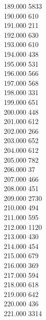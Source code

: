 { 189.000	5833 \\
 190.000	610 \\
 191.000	211 \\
 192.000	630 \\
 193.000	610 \\
 194.000	438 \\
 195.000	531 \\
 196.000	566 \\
 197.000	568 \\
 198.000	331 \\
 199.000	651 \\
 200.000	448 \\
 201.000	612 \\
 202.000	266 \\
 203.000	652 \\
 204.000	612 \\
 205.000	782 \\
 206.000	37 \\
 207.000	466 \\
 208.000	451 \\
 209.000	2730 \\
 210.000	494 \\
 211.000	595 \\
 212.000	1120 \\
 213.000	430 \\
 214.000	454 \\
 215.000	679 \\
 216.000	369 \\
 217.000	594 \\
 218.000	618 \\
 219.000	642 \\
 220.000	436 \\
 221.000	3314 \\
}
